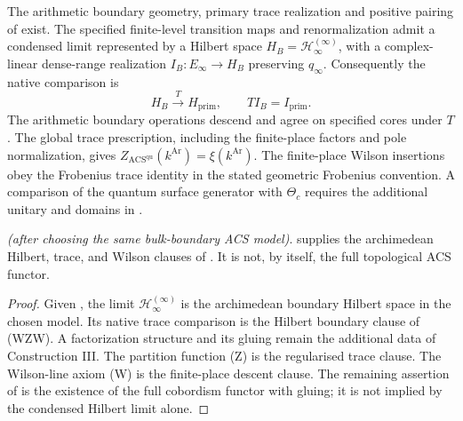 \begin{conjecture}
\label{v4-arith:w10-a:conj:condensed-descent}
The arithmetic boundary geometry, primary trace realization and
positive pairing of  exist.
The specified finite-level transition maps and renormalization admit
a condensed limit represented by a Hilbert space
\(H_B=\mathcal H^{(\infty)}_\infty\), with a complex-linear dense-range realization
\(I_B:E_\infty\to H_B\) preserving \(q_\infty\).
Consequently the native comparison is
\begin{equation}
 H_B\xrightarrow{\ T\ } H_{\mathrm{prim}},\qquad
 TI_B=I_{\mathrm{prim}}.
 \label{v4-arith:w10-a:eq:condensed-descent}
\end{equation}
The arithmetic boundary operations descend and agree on specified
cores under \(T\). The global trace prescription, including the
finite-place factors and pole normalization, gives
\(Z_{\mathrm{ACS}^{\mathrm{qu}}}(k^{\mathrm{Ar}})=\xi(k^{\mathrm{Ar}})\).
The finite-place Wilson insertions obey the Frobenius trace identity
in the stated geometric Frobenius convention.
A comparison of the quantum surface generator with \(\Theta_c\)
requires the additional unitary and domains in
.
\end{conjecture}
\begin{theorem}
\label{v4-arith:w10-a:thm:descent-equivalent}
\ClaimStatusProvedHereConditional \emph{(after choosing the same
bulk-boundary ACS model)}. 
supplies the archimedean Hilbert, trace, and Wilson clauses of
. It is not, by itself, the full
topological ACS functor.
\end{theorem}

\begin{proof}
Given ,
the limit \(\mathcal H^{(\infty)}_{\infty}\) is the archimedean
boundary Hilbert space in the chosen model. Its native trace
comparison is the Hilbert boundary clause of (WZW). A factorization
structure and its gluing remain the additional data of Construction III. The
partition function (Z) is the regularised trace clause. The Wilson-line
axiom (W) is the finite-place descent clause.
The remaining assertion of  is the
existence of the full cobordism functor with gluing; it is not implied
by the condensed Hilbert limit alone.
\end{proof}

